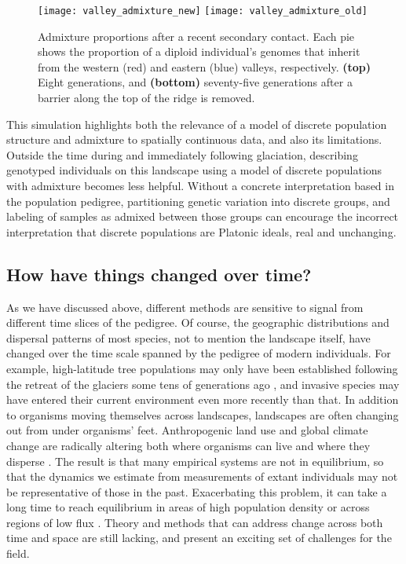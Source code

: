 \documentclass{ar-1col}
\begin{document}
\begin{figure}	%
    \centering
        \texttt{[image: valley\_admixture\_new]}
        \texttt{[image: valley\_admixture\_old]}
        \caption{
            Admixture proportions after a recent secondary contact.
            Each pie shows the proportion of a diploid individual's genomes
            that inherit from the western (red) and eastern (blue) valleys, respectively.
            \textbf{(top)} Eight generations, and
            \textbf{(bottom)} seventy-five generations 
            after a barrier along the top of the ridge is removed.
        }
        \label{postglacial_expansion}
\end{figure}

This simulation highlights both the relevance of 
a model of discrete population structure and admixture
to spatially continuous data, 
and also its limitations.
Outside the time during and immediately following glaciation, 
describing genotyped individuals on this landscape 
using a model of discrete populations with admixture 
becomes less helpful.
Without a concrete interpretation based in the population pedigree,
partitioning genetic variation into discrete groups, 
and labeling of samples as admixed between those groups
can encourage the incorrect interpretation that discrete populations are Platonic ideals,
real and unchanging.

\subsection{How have things changed over time?}

As we have discussed above,
different methods are sensitive to signal
from different time slices of the pedigree.
Of course, the geographic distributions and dispersal patterns of most species,
not to mention the landscape itself,
have changed over the time scale spanned by the pedigree of modern individuals.
For example, 
high-latitude tree populations may only have been established
following the retreat of the glaciers
some tens of generations ago \citep{WhitlockMcCauley1999},
and invasive species may have entered their current
environment even more recently than that.
In addition to organisms moving themselves across landscapes,
landscapes are often changing out from under organisms' feet.
Anthropogenic land use
and global climate change
are radically altering both where organisms can live
and where they disperse \citep{parmesan1999}.
The result is that many empirical systems
are not in equilibrium,
so that the dynamics we estimate from
measurements of extant individuals may
not be representative of those in the past.
Exacerbating this problem,
it can take a long time to reach equilibrium
in areas of high population density
or across regions of low flux
\citep{CrowAoki1984group, whitlock1992temporal, slatkin1993isolation, WhitlockMcCauley1999}.
Theory and methods that can address change across both time and space
are still lacking,
and present an exciting set of challenges for the field.
\end{document}
